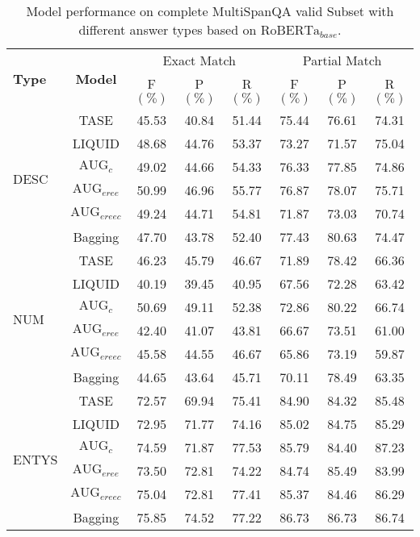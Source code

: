 \begin{table*}[ht]
	\caption{Model performance on complete MultiSpanQA valid Subset with different answer types based on $\text{RoBERTa}_{base}$.}
	\label{tab:robertasub}
	\begin{tabular*}{\textwidth}{@{\extracolsep{\fill}}lccccccc}
		\toprule
		\multirow{2}{*}{\textbf{Type}} & \multirow{2}{*}{\textbf{Model}} & \multicolumn{3}{c}{Exact Match} & \multicolumn{3}{c}{Partial Match} \\
		\cmidrule{3-8} 
		& & F\((\%)\) & P\((\%)\) & R\((\%)\) & F\((\%)\) & P\((\%)\) & R\((\%)\) \\
		\midrule
		\multirow{6}{*}{DESC} & TASE & 45.53 & 40.84 & 51.44 & 75.44 & 76.61 & 74.31 \\ 
		& LIQUID & 48.68 & 44.76 & 53.37 & 73.27 & 71.57 & 75.04 \\
		& $\text{AUG}_{c}$ & 49.02 & 44.66 & 54.33 & 76.33 & 77.85 & 74.86 \\
		& $\text{AUG}_{eree}$ & 50.99 & 46.96 & 55.77 & 76.87 & 78.07 & 75.71 \\
		& $\text{AUG}_{ereec}$ & 49.24 & 44.71 & 54.81 & 71.87 & 73.03 & 70.74 \\
		& Bagging & 47.70 & 43.78 & 52.40 & 77.43 & 80.63 & 74.47 \\
		\midrule
		\multirow{6}{*}{NUM} & TASE & 46.23 & 45.79 & 46.67 & 71.89 & 78.42 & 66.36 \\ 
		& LIQUID & 40.19 & 39.45 & 40.95 & 67.56 & 72.28 & 63.42 \\
		& $\text{AUG}_{c}$ & 50.69 & 49.11 & 52.38 & 72.86 & 80.22 & 66.74 \\
		& $\text{AUG}_{eree}$ & 42.40 & 41.07 & 43.81 & 66.67 & 73.51 & 61.00 \\
		& $\text{AUG}_{ereec}$ & 45.58 & 44.55 & 46.67 & 65.86 & 73.19 & 59.87 \\
		& Bagging & 44.65 & 43.64 & 45.71 & 70.11 & 78.49 & 63.35 \\
		\midrule
		\multirow{6}{*}{ENTYS} & TASE & 72.57 & 69.94 & 75.41 & 84.90 & 84.32 & 85.48 \\ 
		& LIQUID & 72.95 & 71.77 & 74.16 & 85.02 & 84.75 & 85.29 \\
		& $\text{AUG}_{c}$ & 74.59 & 71.87 & 77.53 & 85.79 & 84.40 & 87.23 \\
		& $\text{AUG}_{eree}$ & 73.50 & 72.81 & 74.22 & 84.74 & 85.49 & 83.99 \\
		& $\text{AUG}_{ereec}$ & 75.04 & 72.81 & 77.41 & 85.37 & 84.46 & 86.29 \\
		& Bagging & 75.85 & 74.52 & 77.22 & 86.73 & 86.73 & 86.74 \\
		\bottomrule
	\end{tabular*}
\end{table*}

